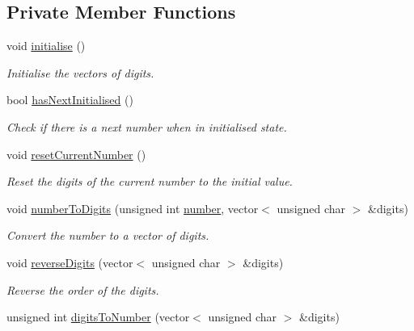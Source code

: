 \subsection*{\-Private \-Member \-Functions}
\begin{DoxyCompactItemize}
\item 
void \hyperlink{classmultiscale_1_1LexicographicNumberIterator_a943745c4723ed8c3c18df9f92bf94d2c}{initialise} ()
\begin{DoxyCompactList}\small\item\em \-Initialise the vectors of digits. \end{DoxyCompactList}\item 
bool \hyperlink{classmultiscale_1_1LexicographicNumberIterator_ac2754a1a57005183e2c9040719c97448}{has\-Next\-Initialised} ()
\begin{DoxyCompactList}\small\item\em \-Check if there is a next number when in initialised state. \end{DoxyCompactList}\item 
void \hyperlink{classmultiscale_1_1LexicographicNumberIterator_a18311f68a49156a415c817a947abcd7d}{reset\-Current\-Number} ()
\begin{DoxyCompactList}\small\item\em \-Reset the digits of the current number to the initial value. \end{DoxyCompactList}\item 
void \hyperlink{classmultiscale_1_1LexicographicNumberIterator_a700e18593ba0cc764d4e517993bd3fdc}{number\-To\-Digits} (unsigned int \hyperlink{classmultiscale_1_1LexicographicNumberIterator_a282d970d0d1a33d2736bbdf104c18336}{number}, vector$<$ unsigned char $>$ \&digits)
\begin{DoxyCompactList}\small\item\em \-Convert the number to a vector of digits. \end{DoxyCompactList}\item 
void \hyperlink{classmultiscale_1_1LexicographicNumberIterator_a4c0a17e03a12256584d9ed3ae19a78c9}{reverse\-Digits} (vector$<$ unsigned char $>$ \&digits)
\begin{DoxyCompactList}\small\item\em \-Reverse the order of the digits. \end{DoxyCompactList}\item 
unsigned int \hyperlink{classmultiscale_1_1LexicographicNumberIterator_a9bcb610b3b63b02ceed7d556960e57c3}{digits\-To\-Number} (vector$<$ unsigned char $>$ \&digits)

\end{DoxyCompactItemize}
